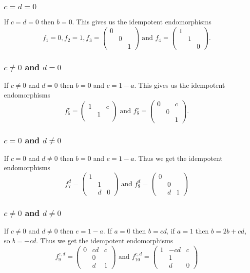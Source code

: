 \documentclass[a4paper,10pt]{article}
\newcommand{\vect}[1]{\begin{pmatrix}#1\end{pmatrix}}
\begin{document}
\subsubsection*{$c = d = 0$}
If $c = d = 0$ then $b = 0$. This gives us the idempotent endomorphisms
\[
 f_1 = 0, f_2 = 1, f_3 = \vect{0&&\\&0&\\&&1} \text{ and } f_4 = \vect{1&&\\&1&\\&&0}.
\]

\subsubsection*{$c \neq 0$ and $d = 0$}
If $c \neq 0$ and $d = 0$ then $b = 0$ and $e = 1-a$. This gives us the idempotent endomorphisms
\[
 f^c_5 = \vect{1&&c\\&1&\\&&} \text{ and } f^c_6 = \vect{0&&c\\&0&\\&&1}.
\]

\subsubsection*{$c = 0$ and $d \neq 0$}
If $c = 0$ and $d \neq 0$ then $b = 0$ and $e = 1-a$. Thus we get the idempotent endomorphisms
\[
 f^d_7 = \vect{1&&\\&1&\\&d&0} \text{ and } f^d_8 = \vect{0&&\\&0&\\&d&1}
\]

\subsubsection*{$c \neq 0$ and $d \neq 0$}
If $c \neq 0$ and $d \neq 0$ then $e = 1-a$. If $a = 0$ then $b = cd$, if $a = 1$ then $b=2b+cd$, so $b=-cd$. Thus we get the idempotent endomorphisms
\[
 f^{c,d}_9 = \vect{0&cd&c\\&0&\\&d&1} \text{ and } f^{c,d}_{10} = \vect{1&-cd&c\\&1&\\&d&0}
\]
\end{document}
